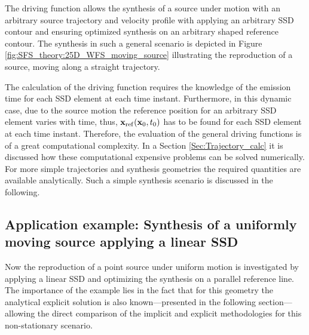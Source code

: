 The driving function allows the synthesis of a source under motion with an arbitrary source trajectory and velocity profile with applying an arbitrary SSD contour and ensuring optimized synthesis on an arbitrary shaped reference contour.
The synthesis in such a general scenario is depicted in Figure \ref{fig:SFS_theory:25D_WFS_moving_source} illustrating the reproduction of a source, moving along a straight trajectory.

The calculation of the driving function requires the knowledge of the emission time for each SSD element at each time instant.
Furthermore, in this dynamic case, due to the source motion the reference position for an arbitrary SSD element varies with time, thus, $\mathbf{x}_{\mathrm{ref}}(\mathbf{x}_0,t_0)$ has to be found for each SSD element at each time instant.
Therefore, the evaluation of the general driving functions is of a great computational complexity.
In a Section \ref{Sec:Trajectory_calc} it is discussed how these computational expensive problems can be solved numerically.
For more simple trajectories and synthesis geometries the required quantities are available analytically.
Such a simple synthesis scenario is discussed in the following.

\subsection*{Application example: Synthesis of a uniformly moving source applying a linear SSD}

Now the reproduction of a point source under uniform motion is investigated by applying a linear SSD and optimizing the synthesis on a parallel reference line.
The importance of the example lies in the fact that for this geometry the analytical explicit solution is also known---presented in the following section---allowing the direct comparison of the implicit and explicit methodologies for this non-stationary scenario.

